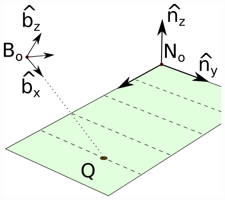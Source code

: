 \documentclass[11pt,letterpaper]{book}
\begin{document}
\begin{enumerate}
\begin{enumerate}
\begin{minipage}[t]{0.6\linewidth}
\begin{itemize}
\end{itemize}
\end{minipage}
\hfill
\begin{minipage}[t]{0.35\linewidth}
\flushright
\vspace*{0pt}
\includegraphics[width=\linewidth]{football.png}
\end{minipage}


\end{enumerate}
\end{enumerate}
\end{document}

